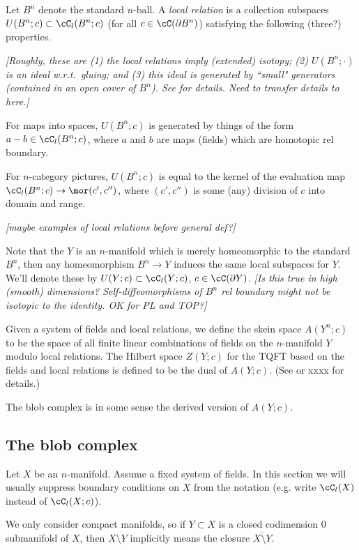 \documentclass[11pt,leqno]{amsart}
\def\bd{\partial}
\def\sub{\subset}
\def\setmin{\setminus}
\def\nn#1{{{\it \small [#1]}}}
\begin{document}
Let $B^n$ denote the standard $n$-ball.
A {\it local relation} is a collection subspaces $U(B^n; c) \sub \cC_l(B^n; c)$
(for all $c \in \cC(\bd B^n)$) satisfying the following (three?) properties.

\nn{Roughly, these are (1) the local relations imply (extended) isotopy;
(2) $U(B^n; \cdot)$ is an ideal w.r.t.\ gluing; and
(3) this ideal is generated by ``small" generators (contained in an open cover of $B^n$).
See \cite{kw:tqft} for details.  Need to transfer details to here.}

For maps into spaces, $U(B^n; c)$ is generated by things of the form $a-b \in \cC_l(B^n; c)$,
where $a$ and $b$ are maps (fields) which are homotopic rel boundary.

For $n$-category pictures, $U(B^n; c)$ is equal to the kernel of the evaluation map
$\cC_l(B^n; c) \to \mor(c', c'')$, where $(c', c'')$ is some (any) division of $c$ into
domain and range.

\nn{maybe examples of local relations before general def?}

Note that the $Y$ is an $n$-manifold which is merely homeomorphic to the standard $B^n$,
then any homeomorphism $B^n \to Y$ induces the same local subspaces for $Y$.
We'll denote these by $U(Y; c) \sub \cC_l(Y; c)$, $c \in \cC(\bd Y)$.
\nn{Is this true in high (smooth) dimensions?  Self-diffeomorphisms of $B^n$
rel boundary might not be isotopic to the identity.  OK for PL and TOP?}

Given a system of fields and local relations, we define the skein space
$A(Y^n; c)$ to be the space of all finite linear combinations of fields on
the $n$-manifold $Y$ modulo local relations.
The Hilbert space $Z(Y; c)$ for the TQFT based on the fields and local relations
is defined to be the dual of $A(Y; c)$.
(See \cite{kw:tqft} or xxxx for details.)

The blob complex is in some sense the derived version of $A(Y; c)$.



\subsection{The blob complex}
\label{sec:blob-definition}

Let $X$ be an $n$-manifold.
Assume a fixed system of fields.
In this section we will usually suppress boundary conditions on $X$ from the notation
(e.g. write $\cC_l(X)$ instead of $\cC_l(X; c)$).

We only consider compact manifolds, so if $Y \sub X$ is a closed codimension 0
submanifold of $X$, then $X \setmin Y$ implicitly means the closure
$\overline{X \setmin Y}$.
\end{document}
